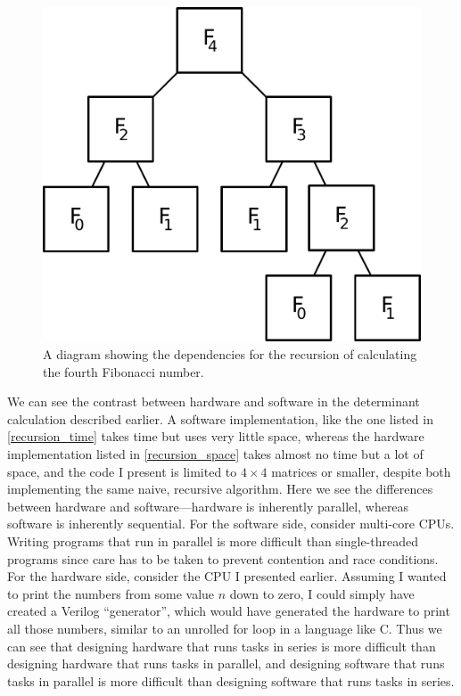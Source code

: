 \documentclass[12pt]{article}
\begin{document}
\begin{figure}[thp]
	\centering
	
	\includegraphics[width=\textwidth]{fib-block.pdf}
	
	\caption{A diagram showing the dependencies for the recursion of calculating the fourth Fibonacci number.}
	\label{fib_block}
\end{figure}

We can see the contrast between hardware and software in the determinant calculation described earlier. A software implementation, like the one listed in \ref{recursion_time} takes time but uses very little space, whereas the hardware implementation listed in \ref{recursion_space} takes almost no time but a lot of space, and the code I present is limited to $4\times4$ matrices or smaller, despite both implementing the same naive, recursive algorithm. Here we see the differences between hardware and software---hardware is inherently parallel, whereas software is inherently sequential. For the software side, consider multi-core CPUs. Writing programs that run in parallel is more difficult than single-threaded programs since care has to be taken to prevent contention and race conditions. For the hardware side, consider the CPU I presented earlier. Assuming I wanted to print the numbers from some value $n$ down to zero, I could simply have created a Verilog ``generator'', which would have generated the hardware to print all those numbers, similar to an unrolled for loop in a language like C. Thus we can see that designing hardware that runs tasks in series is more difficult than designing hardware that runs tasks in parallel, and designing software that runs tasks in parallel is more difficult than designing software that runs tasks in series.
\end{document}
